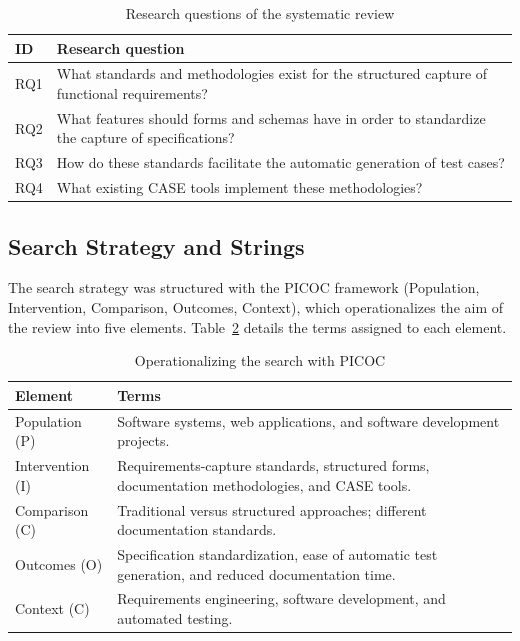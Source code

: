 \documentclass[10pt,journal,twoside,letterpaper]{IEEEtran}
\begin{document}
    \begin{table}[!tb]
        \caption{Research questions of the systematic review}
        \label{tab:rqs}
        \centering
        \small
        \begin{tabular}{@{}p{}p{}@{}}
            \toprule
            \textbf{ID} & \textbf{Research question} \\
            \midrule
            RQ1 & What standards and methodologies exist for the structured capture of functional requirements? \\
            RQ2 & What features should forms and schemas have in order to standardize the capture of specifications? \\
            RQ3 & How do these standards facilitate the automatic generation of test cases? \\
            RQ4 & What existing CASE tools implement these methodologies? \\
            \bottomrule
        \end{tabular}
    \end{table}
    
    \subsection{Search Strategy and Strings}
    \label{subsec:busqueda}
    
    The search strategy was structured with the PICOC framework (Population, Intervention, Comparison, Outcomes, Context), which operationalizes the aim of the review into five elements. Table~\ref{tab:picoc} details the terms assigned to each element.
    
    \begin{table}[!tb]
        \caption{Operationalizing the search with PICOC}
        \label{tab:picoc}
        \centering
        \small
        \begin{tabular}{@{}p{}p{}@{}}
            \toprule
            \textbf{Element} & \textbf{Terms} \\
            \midrule
            Population (P)   & Software systems, web applications, and software development projects. \\
            Intervention (I) & Requirements-capture standards, structured forms, documentation methodologies, and CASE tools. \\
            Comparison (C)   & Traditional versus structured approaches; different documentation standards. \\
            Outcomes (O)     & Specification standardization, ease of automatic test generation, and reduced documentation time. \\
            Context (C)      & Requirements engineering, software development, and automated testing. \\
            \bottomrule
        \end{tabular}
    \end{table}
    
\end{document}
